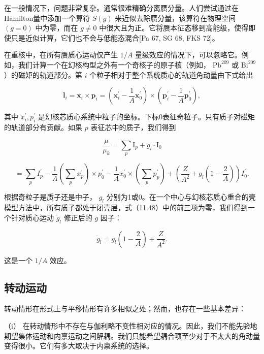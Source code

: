 在一般情况下，问题非常复杂。通常很难精确分离赝分量。人们尝试通过在Hamilton量中添加一个算符 $S\left(g\right)$
来近似去除赝分量，该算符在物理空间 $\left({g=0}\right)$ 中为零，而在 $g\neq0$ 中很大且为正。它将赝本征态移到高能级，使得即使只是近似计算，它们也不会与低能态混合{[}Pa
67, SG 68, FKS 72{]}。

在重核中，在所有赝质心运动仅产生 $1/A$ 量级效应的情况下，可以忽略它。例如，我们计算一个在幻核构型之外有一个奇核子的原子核（例如，
${\mathrm{{Pb}}}^{209}$ 或 ${\mathrm{{Bi}}}^{209}$ ）的磁矩的轨道部分。第 $i$
个粒子相对于整个系统质心的轨道角动量由下式给出

\[
{\boldsymbol{l}}_{i}={\boldsymbol{x}}_{i}\times{\boldsymbol{p}}_{i}=\left({{\boldsymbol{x}}^{\prime}_{i}-\frac{1}{A}{\boldsymbol{x}}^{\prime}_{0}}\right)\times\left({{\boldsymbol{p}}^{\prime}_{i}-\frac{1}{A}{\boldsymbol{p}}^{\prime}_{0}}\right),\tag{11.47}
\]

其中 ${x}^{\prime}_{i},{p}^{\prime}_{i}$ 是幻核芯质心系统中粒子的坐标。下标0表征奇粒子。只有质子对磁矩的轨道部分有贡献。如果
$p$ 表征芯中的质子，我们得到

\[
\frac{\mu}{{\mu}_{k}}=\mathop{\sum}\limits_{p}{\mathrm{I}}_{p}+{g}_{l}\cdot{\mathrm{I}}_{0}
\]

\[
=\mathop{\sum}\limits_{p}{I}^{\prime}_{p}-\frac{1}{A}\left({\mathop{\sum}\limits_{p}{x}^{\prime}_{p}}\right)\times{p}^{\prime}_{0}-\frac{1}{A}{x}^{\prime}_{0}\times\left({\mathop{\sum}\limits_{p}{p}^{\prime}_{p}}\right)+\left({\frac{Z}{{A}^{2}}+{g}_{l}\left({1-\frac{2}{A}}\right)}\right){I}^{\prime}_{0}.\tag{11.48}
\]

根据奇粒子是质子还是中子， ${g}_{l}$ 分别为1或0。在一个中心与幻核芯质心重合的壳模型方法中，所有质子都处于闭壳层，式（11.48）中的前三项为零，我们得到一个针对质心运动
${\widetilde{g}}_{l}$ 修正后的 $g$ 因子：

\[
{\widetilde{g}}_{l}={g}_{l}\left({1-\frac{2}{A}}\right)+\frac{Z}{{A}^{2}}.\tag{11.49}
\]

这是一个 $1/A$ 效应。

\subsection{转动运动}

转动情形在形式上与平移情形有许多相似之处；然而，也存在一些基本差异：

（i） 在转动情形中不存在与伽利略不变性相对应的情况。因此，我们不能先验地期望集体运动和内禀运动之间解耦。我们只能希望耦合项至少对于不太大的角动量变得很小。它们有多大取决于内禀系统的选择。

